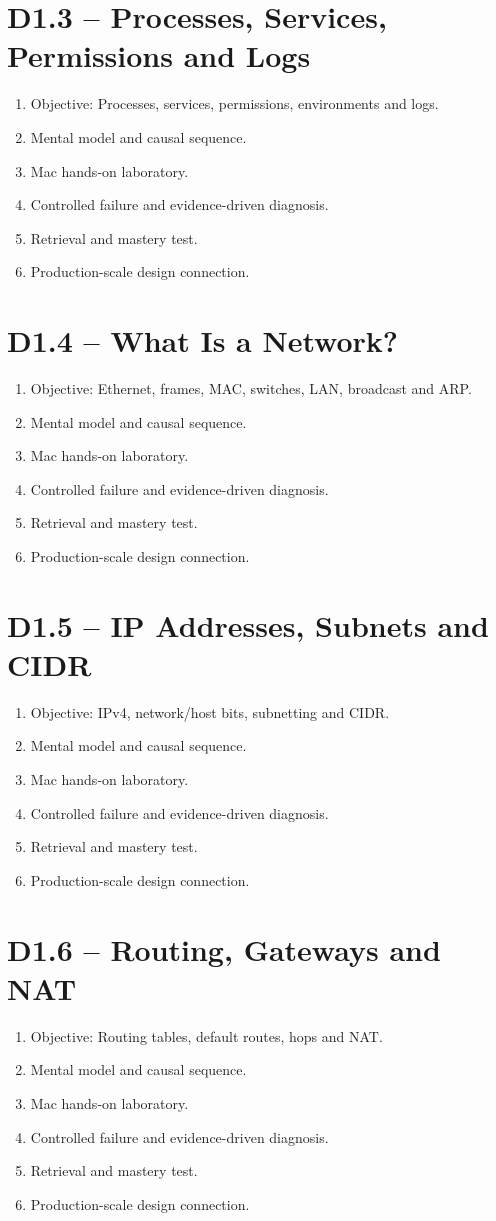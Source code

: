 \documentclass[11pt,a4paper]{book}
\begin{document}
\section{D1.3 -- Processes, Services, Permissions and Logs}
\begin{enumerate}
\item Objective: Processes, services, permissions, environments and logs.
\item Mental model and causal sequence.
\item Mac hands-on laboratory.
\item Controlled failure and evidence-driven diagnosis.
\item Retrieval and mastery test.
\item Production-scale design connection.
\end{enumerate}
\section{D1.4 -- What Is a Network?}
\begin{enumerate}
\item Objective: Ethernet, frames, MAC, switches, LAN, broadcast and ARP.
\item Mental model and causal sequence.
\item Mac hands-on laboratory.
\item Controlled failure and evidence-driven diagnosis.
\item Retrieval and mastery test.
\item Production-scale design connection.
\end{enumerate}
\section{D1.5 -- IP Addresses, Subnets and CIDR}
\begin{enumerate}
\item Objective: IPv4, network/host bits, subnetting and CIDR.
\item Mental model and causal sequence.
\item Mac hands-on laboratory.
\item Controlled failure and evidence-driven diagnosis.
\item Retrieval and mastery test.
\item Production-scale design connection.
\end{enumerate}
\section{D1.6 -- Routing, Gateways and NAT}
\begin{enumerate}
\item Objective: Routing tables, default routes, hops and NAT.
\item Mental model and causal sequence.
\item Mac hands-on laboratory.
\item Controlled failure and evidence-driven diagnosis.
\item Retrieval and mastery test.
\item Production-scale design connection.
\end{enumerate}
\end{document}
